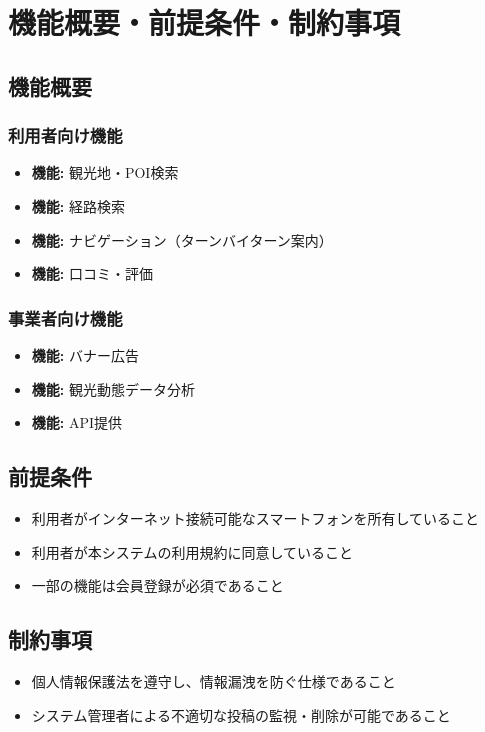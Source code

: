 \documentclass[a4j, 11pt, report]{jsarticle}
\begin{document}
\section{機能概要・前提条件・制約事項}

\subsection{機能概要}
\subsubsection{利用者向け機能}
\begin{itemize}
    \item \textbf{機能:} 観光地・POI検索
    \item \textbf{機能:} 経路検索
    \item \textbf{機能:} ナビゲーション（ターンバイターン案内）
    \item \textbf{機能:} 口コミ・評価
\end{itemize}

\subsubsection{事業者向け機能}
\begin{itemize}
    \item \textbf{機能:} バナー広告
    \item \textbf{機能:} 観光動態データ分析
    \item \textbf{機能:} API提供
\end{itemize}

\subsection{前提条件}
\begin{itemize}
    \item 利用者がインターネット接続可能なスマートフォンを所有していること
    \item 利用者が本システムの利用規約に同意していること
    \item 一部の機能は会員登録が必須であること
\end{itemize}

\subsection{制約事項}
\begin{itemize}
    \item 個人情報保護法を遵守し、情報漏洩を防ぐ仕様であること
    \item システム管理者による不適切な投稿の監視・削除が可能であること
\end{itemize}
\end{document}
